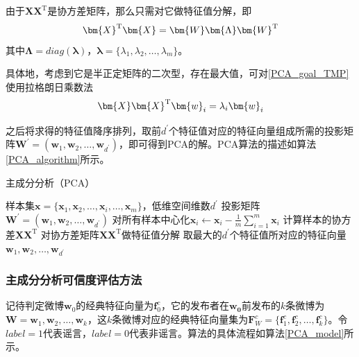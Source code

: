 \documentclass[a4paper,AutoFakeBold,oneside,12pt]{book}
\begin{document}
由于$\bm{X}\bm{X}^ \mathrm{ T }$是协方差矩阵，那么只需对它做特征值分解，即
\begin{equation}
\label{PCA_eigenvalue}
\bm{X}^ \mathrm{ T }\bm{X} = \bm{W}\bm{\Lambda}\bm{W}^ \mathrm{ T } \\
\end{equation}
其中$\bm{\Lambda}=diag(\bm{\lambda})$，$\bm{\lambda} = \{\lambda_1,\lambda_2,\ldots,\lambda_m\}$。

具体地，考虑到它是半正定矩阵的二次型，存在最大值，可对\eqref{PCA_goal_TMP}使用拉格朗日乘数法
\begin{equation}
\bm{X}\bm{X}^ \mathrm{ T }\bm{w}_i  = \lambda_i \bm{w}_i \\
\end{equation}

之后将求得的特征值降序排列，取前$d^\prime$个特征值对应的特征向量组成所需的投影矩阵$\bm{W}^\prime =(\bm{w}_1,\bm{w}_2,\ldots,\bm{w}_{d^\prime})$，即可得到PCA的解。PCA算法的描述如算法\ref{PCA_algorithm}所示。

\begin{algorithm} 
	\begin{spacing}{1.3}
		\caption{主成分分析（PCA）} 
		\label{PCA_algorithm}
		\renewcommand{\algorithmicrequire}{\textbf{输入：}}
		\renewcommand{\algorithmicensure}{\textbf{输出：}} 
		\begin{algorithmic}[1] 
			\Require 样本集$\bm{x}=\{\bm{x}_1,\bm{x}_2,\ldots,\bm{x}_i,\ldots,\bm{x}_m\}$，低维空间维数$d^\prime$ 
			\Ensure 投影矩阵  $\bm{W}^\prime =(\bm{w}_1,\bm{w}_2,\ldots,\bm{w}_{d^\prime})$
			\State 对所有样本中心化$\bm{x}_i \gets \bm{x}_i - \frac{1}{m}\sum_{i=1}^m \bm{x}_i$
			\State  计算样本的协方差$\bm{X}\bm{X}^ \mathrm{T}$
			\State 对协方差矩阵$\bm{X}\bm{X}^ \mathrm{T}$做特征值分解
			\State 取最大的$d^\prime$个特征值所对应的特征向量$\bm{w}_1,\bm{w}_2,\ldots,\bm{w}_{d^\prime}$
		\end{algorithmic}  
	\end{spacing}
\end{algorithm}

\subsubsection{主成分分析可信度评估方法}
记待判定微博$\bm{w}_0$的经典特征向量为$\bm{f}^{c}_{0}$，它的发布者在$\bm{w_0}$前发布的$k$条微博为$\bm{W} = \bm{w}_1,\bm{w}_2,\ldots,\bm{w}_k$，这$k$条微博对应的经典特征向量集为$\bm{F}^{c}_{W} = \{ \bm{f}^{c}_{1},\bm{f}^{c}_{2},\ldots,\bm{f}^{c}_{k} \}$。令$label = 1$代表谣言，$label = 0$代表非谣言。算法的具体流程如算法\ref{PCA_model}所示。
\end{document}
